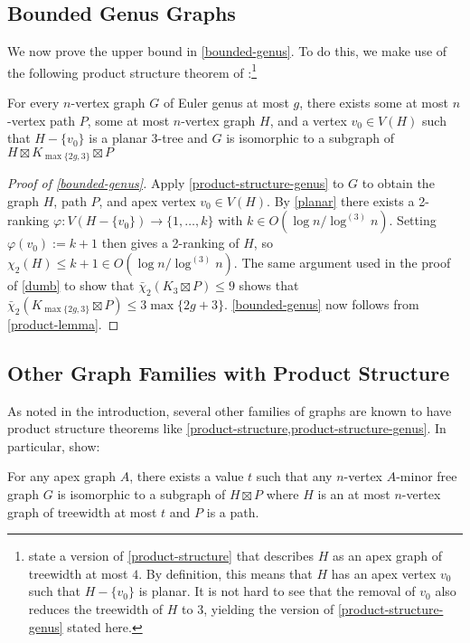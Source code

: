 \documentclass[kpfonts]{patmorin}
\newcommand{\trn}{\chi_2}
\newcommand{\dtcn}{\bar{\chi}_2}
\theoremstyle{named}
\begin{document}
\subsection{Bounded Genus Graphs}

We now prove the upper bound in \cref{bounded-genus}. To do this, we make use of the following product structure theorem of \citet{dujmovic.joret.ea:planar}:\footnote{\citet{dujmovic.joret.ea:planar} state a version of \cref{product-structure} that describes $H$ as an apex graph of treewidth at most $4$.  By definition, this means that $H$ has an apex vertex $v_0$ such that $H-\{v_0\}$ is planar.  It is not hard to see that the removal of $v_0$ also reduces the treewidth of $H$ to 3, yielding the version of \cref{product-structure-genus} stated here.}

\begin{thm} \label{product-structure-genus}
    For every $n$-vertex graph $G$ of Euler genus at most $g$, there exists some at most $n$-vertex path $P$, some at most $n$-vertex graph $H$, and a vertex $v_0\in V(H)$ such that $H-\{v_0\}$ is a planar 3-tree and $G$ is isomorphic to a subgraph of $H\boxtimes K_{\max\{2g,3\}}\boxtimes P$
\end{thm}

\begin{proof}[Proof of \cref{bounded-genus}]
    Apply \cref{product-structure-genus} to $G$ to obtain the graph $H$, path $P$, and apex vertex $v_0\in V(H)$.  By \cref{planar} there exists a 2-ranking $\varphi:V(H-\{v_0\})\to \{1,\ldots,k\}$ with $k\in O(\log n/\log^{(3)} n)$. Setting $\varphi(v_0):=k+1$ then gives a 2-ranking of $H$, so $\trn(H)\le k+1\in O(\log n/\log^{(3)} n)$.  The same argument used in the proof of \cref{dumb} to show that $\dtcn(K_3\boxtimes P)\le 9$ shows that $\dtcn(K_{\max\{2g,3\}}\boxtimes P)\le 3\max\{2g+3\}$.  \cref{bounded-genus} now follows from \cref{product-lemma}.
\end{proof}

\subsection{Other Graph Families with Product Structure}

As noted in the introduction, several other families of graphs are known to have product structure theorems like \cref{product-structure,product-structure-genus}.  In particular, \citet{dujmovic.joret.ea:planar} show:

\begin{thm}\label{apex-minor-free}
    For any apex graph $A$, there exists a value $t$ such that any $n$-vertex $A$-minor free graph $G$ is isomorphic to a subgraph of $H\boxtimes P$ where $H$ is an at most $n$-vertex graph of treewidth at most $t$ and $P$ is a path.
\end{thm}
\end{document}
